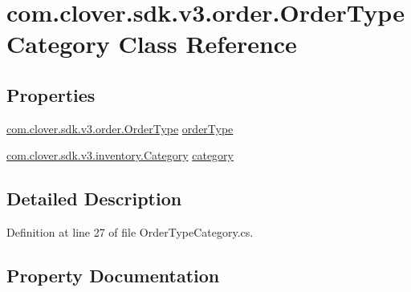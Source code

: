 \hypertarget{classcom_1_1clover_1_1sdk_1_1v3_1_1order_1_1_order_type_category}{}\section{com.\+clover.\+sdk.\+v3.\+order.\+Order\+Type\+Category Class Reference}
\label{classcom_1_1clover_1_1sdk_1_1v3_1_1order_1_1_order_type_category}
\subsection*{Properties}
\begin{DoxyCompactItemize}
\item 
\hyperlink{classcom_1_1clover_1_1sdk_1_1v3_1_1order_1_1_order_type}{com.\+clover.\+sdk.\+v3.\+order.\+Order\+Type} \hyperlink{classcom_1_1clover_1_1sdk_1_1v3_1_1order_1_1_order_type_category_a70c6c9677782416203ee5eba23ecd029}{order\+Type}
\item 
\hyperlink{classcom_1_1clover_1_1sdk_1_1v3_1_1inventory_1_1_category}{com.\+clover.\+sdk.\+v3.\+inventory.\+Category} \hyperlink{classcom_1_1clover_1_1sdk_1_1v3_1_1order_1_1_order_type_category_a9c9a3ce76a7527c0ff1a51cb9f48518c}{category}
\end{DoxyCompactItemize}


\subsection{Detailed Description}


Definition at line 27 of file Order\+Type\+Category.\+cs.



\subsection{Property Documentation}
\mbox{\label{classcom_1_1clover_1_1sdk_1_1v3_1_1order_1_1_order_type_category_a9c9a3ce76a7527c0ff1a51cb9f48518c}} 
